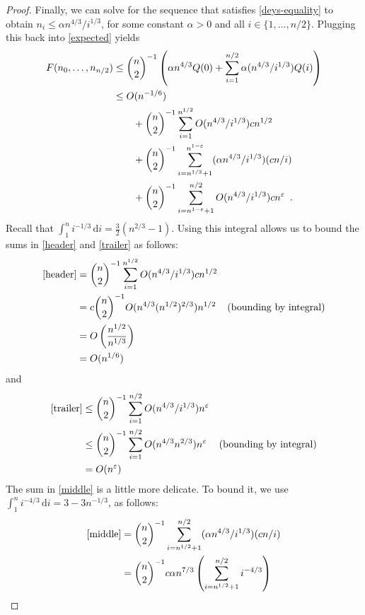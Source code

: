 \documentclass{patmorin}
\newcommand{\eps}{\varepsilon}
\begin{document}
\begin{proof}
  Finally, we can solve for the sequence that satisfies
  \eqref{deys-equality} to obtain $n_i \le \alpha n^{4/3}/i^{1/3}$, for
  some constant $\alpha>0$ and all $i\in\{1,\ldots,n/2\}$.  Plugging this
  back into \eqref{expected} yields
  \begin{align}
     F(n_0,\ldots,n_{n/2}) 
      & \le \binom{n}{2}^{-1}\left(\alpha n^{4/3} Q(0)+\sum_{i=1}^{n/2} \alpha (n^{4/3}/i^{1/3})Q(i)\right) \notag \\
      & \le O(n^{-1/6}) \notag \\
      & \qquad {} + \binom{n}{2}^{-1}\sum_{i=1}^{n^{1/2}} O(n^{4/3}/i^{1/3})cn^{1/2}  \eqlabel{header}\\
      & \qquad {} + \binom{n}{2}^{-1}\sum_{i=n^{1/2}+1}^{n^{1-\eps}} (\alpha n^{4/3}/i^{1/3})(cn/i)  \eqlabel{middle} \\
      & \qquad {} + \binom{n}{2}^{-1}\sum_{i=n^{1-\eps}+1}^{n/2} O(n^{4/3}/i^{1/3})cn^{\eps} \eqlabel{trailer} \enspace .
  \end{align}
  Recall that $\int_1^n i^{-1/3}\,\mathrm{d}i = \frac{3}{2}(n^{2/3}-1)$.
  Using this integral allows us to bound the sums in \eqref{header}
  and \eqref{trailer} as follows:
  \begin{align*}
    \eqref{header} & = \binom{n}{2}^{-1}\sum_{i=1}^{n^{1/2}} O(n^{4/3}/i^{1/3})cn^{1/2} \\
        & = c\binom{n}{2}^{-1}O(n^{4/3}(n^{1/2})^{2/3})n^{1/2}
           & \text{(bounding by integral)}  \\
        & = O\left(\frac{n^{1/2}}{n^{1/3}}\right) \\
        & = O(n^{1/6})
  \end{align*}
  and 
  \begin{align*}
    \eqref{trailer} 
      & \le \binom{n}{2}^{-1}\sum_{i=1}^{n/2} O(n^{4/3}/i^{1/3})n^{\eps} \\
      & \le \binom{n}{2}^{-1}\sum_{i=1}^{n/2} O(n^{4/3}n^{2/3})n^{\eps} 
                & \text{(bounding by integral)} \\
        & = O(n^{\eps})
  \end{align*}
  The sum in \eqref{middle} is a little more delicate.  To bound it, we
  use $\int_1^n i^{-4/3}\,\mathrm{d}i = 3-3n^{-1/3}$, as follows:
  \begin{align*}
    \eqref{middle} 
      & = \binom{n}{2}^{-1}
       \sum_{i=n^{1/2}+1}^{n/2} (\alpha n^{4/3}/i^{1/3})(cn/i) \\
      & = \binom{n}{2}^{-1}
       c\alpha n^{7/3}\left(\sum_{i=n^{1/2}+1}^{n/2} i^{-4/3} \right) \\

\end{align*}
\end{proof}
\end{document}
